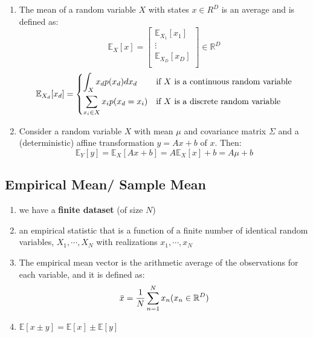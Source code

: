 \begin{enumerate}
    \item The mean of a random variable $X$ with states $x \in R^D$ is an average and is defined as: \cite{mfml-1}
    \[
        \mathbb{E}_X[x]
        = \begin{bmatrix}
            \mathbb{E}_{X_1}[x_1] \\
            \vdots \\
            \mathbb{E}_{X_D}[x_D] \\
        \end{bmatrix} \in \mathbb{R}^D
    \]
    \[
        \mathbb{E}_{X_d}[x_d]
        = \begin{cases}
            \displaystyle\int_X x_d p(x_d) dx_d
            & \text{if $X$ is a continuous random variable}\\[2ex]
            \displaystyle\sum_{x_i \in X} x_i p(x_d=x_i)
            & \text{if $X$ is a discrete random variable}
        \end{cases}
    \]

    \item Consider a random variable $X$ with mean $\mu$ and covariance matrix $\Sigma$ and a (deterministic) affine transformation $y = Ax + b$ of $x$. Then:
    \[
        \mathbb{E}_Y[y] 
        = \mathbb{E}_X[Ax + b] 
        = A\mathbb{E}_X[x] + b 
        = A\mu + b
    \]
\end{enumerate}

\subsection{Empirical Mean/ Sample Mean \cite{mfml-1}} \label{Multivariate Distributions: Empirical Mean/ Sample Mean}

\begin{enumerate}
    \item we have a \textbf{finite dataset} (of size $N$)

    \item an empirical statistic that is a function of a finite number of identical random variables, $X_1, \cdots , X_N$ with realizations $x_1, \cdots , x_N$

    \item The empirical mean vector is the arithmetic average of the observations for each variable, and it is defined as:
    \[
        \bar{x} = \dfrac{1}{N}
        \dsum_{n=1}^{N} x_n
        \hfill
        (x_n \in \mathbb{R}^D)
    \]

    \item $\mathbb{E}[x \pm y] = \mathbb{E}[x] \pm \mathbb{E}[y]$
\end{enumerate}


